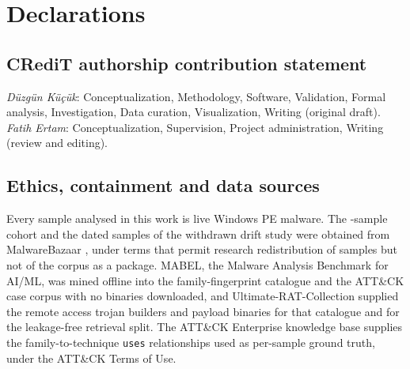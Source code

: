 \section*{Declarations}
\label{sec:declarations}

\subsection*{CRediT authorship contribution statement}\label{credit}

\emph{D\"uzg\"un K\"u\c{c}\"uk}: Conceptualization, Methodology, Software, Validation, Formal
analysis, Investigation, Data curation, Visualization, Writing (original draft).
\emph{Fatih Ertam}: Conceptualization, Supervision, Project administration, Writing (review and
editing).

\subsection*{Ethics, containment and data sources}\label{ethics-and-containment}

Every sample analysed in this work is live Windows PE malware. The -sample cohort
and the  dated samples of the withdrawn drift study were obtained from MalwareBazaar
\citep{abusech2026bazaar}, under terms that permit research redistribution of
samples but not of the corpus as a package. MABEL, the Malware Analysis Benchmark for AI/ML, was
mined offline into the family-fingerprint catalogue and the ATT\&CK case corpus with no binaries
downloaded, and Ultimate-RAT-Collection supplied the remote access trojan builders and payload
binaries for that catalogue and for the leakage-free retrieval split. The ATT\&CK Enterprise
knowledge base \citep{mitre2026attack} supplies the family-to-technique \texttt{uses}
relationships used as per-sample ground truth, under the ATT\&CK Terms of Use.

